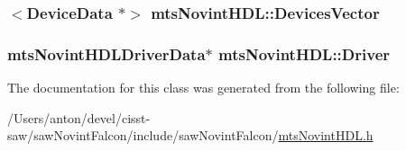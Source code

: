 \subsubsection[{Devices\+Vector}]{$<${\bf Device\+Data} $\ast$$>$ mts\+Novint\+H\+D\+L\+::\+Devices\+Vector\hspace{0.3cm}{\ttfamily [protected]}}\label{classmts_novint_h_d_l_a7f19ef6b35fd78933bb09d8adeedf986}
\hypertarget{classmts_novint_h_d_l_a8eeac12be5c50e55c932e88fea791632}{}
\subsubsection[{Driver}]{\setlength{\rightskip}{0pt plus 5cm}mts\+Novint\+H\+D\+L\+Driver\+Data$\ast$ mts\+Novint\+H\+D\+L\+::\+Driver\hspace{0.3cm}{\ttfamily [protected]}}\label{classmts_novint_h_d_l_a8eeac12be5c50e55c932e88fea791632}


The documentation for this class was generated from the following file\+:\begin{DoxyCompactItemize}
\item 
/\+Users/anton/devel/cisst-\/saw/saw\+Novint\+Falcon/include/saw\+Novint\+Falcon/\hyperlink{mts_novint_h_d_l_8h}{mts\+Novint\+H\+D\+L.\+h}\end{DoxyCompactItemize}
